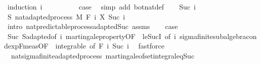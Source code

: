\begin{isabellebody}
%
\isadelimproof
%
\endisadelimproof
%
\isatagproof
{}\isamarkupfalse%
\ {\isacharparenleft}{\kern0pt}induction\ i{\isacharparenright}{\kern0pt}\isanewline
\ \ \isamarkupfalse%
\ {}\isanewline
\ \ \isamarkupfalse%
\ \isamarkupfalse%
\ {\isacharquery}{\kern0pt}case\ \isamarkupfalse%
\ {\isacharparenleft}{\kern0pt}simp\ add{\isacharcolon}{\kern0pt}\ bot{\isacharunderscore}{\kern0pt}nat{\isacharunderscore}{\kern0pt}def{\isacharparenright}{\kern0pt}\isanewline
{}\isamarkupfalse%
\isanewline
\ \ \isamarkupfalse%
\ {\isacharparenleft}{\kern0pt}Suc\ i{\isacharparenright}{\kern0pt}\isanewline
\ \ \isamarkupfalse%
\ S{\isacharcolon}{\kern0pt}\ nat{\isacharunderscore}{\kern0pt}adapted{\isacharunderscore}{\kern0pt}process\ M\ F\ {\isachardoublequoteopen}{\isasymlambda}i{\isachardot}{\kern0pt}\ X\ {\isacharparenleft}{\kern0pt}Suc\ i{\isacharparenright}{\kern0pt}{\isachardoublequoteclose}\ \isamarkupfalse%
\ {\isacharparenleft}{\kern0pt}intro\ nat{\isacharunderscore}{\kern0pt}predictable{\isacharunderscore}{\kern0pt}process{\isachardot}{\kern0pt}adapted{\isacharunderscore}{\kern0pt}Suc\ assms{\isacharparenright}{\kern0pt}\isanewline
\ \ \isamarkupfalse%
\ {\isacharquery}{\kern0pt}case\ \isamarkupfalse%
\ Suc\ S{\isachardot}{\kern0pt}adapted{\isacharbrackleft}{\kern0pt}of\ i{\isacharbrackright}{\kern0pt}\ martingale{\isacharunderscore}{\kern0pt}property{\isacharbrackleft}{\kern0pt}OF\ {\isacharunderscore}{\kern0pt}\ le{\isacharunderscore}{\kern0pt}SucI{\isacharcomma}{\kern0pt}\ of\ i{\isacharbrackright}{\kern0pt}\ sigma{\isacharunderscore}{\kern0pt}finite{\isacharunderscore}{\kern0pt}subalgebra{\isachardot}{\kern0pt}cond{\isacharunderscore}{\kern0pt}exp{\isacharunderscore}{\kern0pt}F{\isacharunderscore}{\kern0pt}meas{\isacharbrackleft}{\kern0pt}OF\ {\isacharunderscore}{\kern0pt}\ integrable{\isacharcomma}{\kern0pt}\ of\ {\isachardoublequoteopen}F\ i{\isachardoublequoteclose}\ {\isachardoublequoteopen}Suc\ i{\isachardoublequoteclose}{\isacharbrackright}{\kern0pt}\ \isamarkupfalse%
\ fastforce\isanewline
{}\isamarkupfalse%
%
\endisatagproof
{\isafoldproof}%
%
\isadelimproof
\isanewline
%
\endisadelimproof
\isanewline
{}\isamarkupfalse%
\ {\isacharparenleft}{\kern0pt}\ nat{\isacharunderscore}{\kern0pt}sigma{\isacharunderscore}{\kern0pt}finite{\isacharunderscore}{\kern0pt}adapted{\isacharunderscore}{\kern0pt}process{\isacharparenright}{\kern0pt}\ martingale{\isacharunderscore}{\kern0pt}of{\isacharunderscore}{\kern0pt}set{\isacharunderscore}{\kern0pt}integral{\isacharunderscore}{\kern0pt}eq{\isacharunderscore}{\kern0pt}Suc{\isacharcolon}{\kern0pt}\isanewline

\end{isabellebody}
